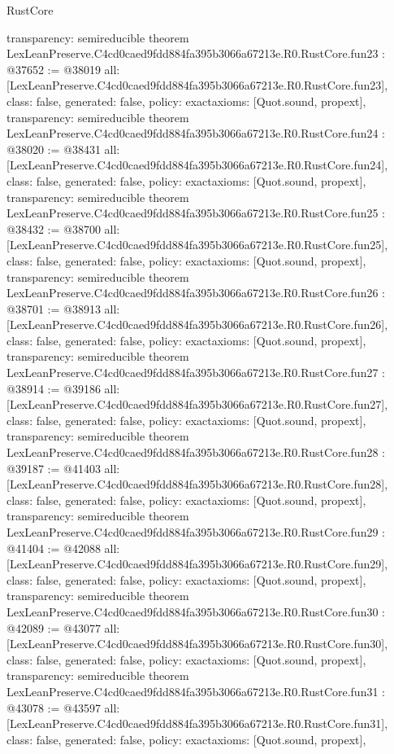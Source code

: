 \begin{lexlean}{RustCore}
\begin{coremodule}
{  transparency: semireducible
}
theorem LexLeanPreserve.C4cd0caed9fdd884fa395b3066a67213e.R0.RustCore.fun23 : @37652 := @38019 {
  all: [LexLeanPreserve.C4cd0caed9fdd884fa395b3066a67213e.R0.RustCore.fun23],
  class: false,
  generated: false,
  policy: exact{axioms: [Quot.sound, propext]},
  transparency: semireducible
}
theorem LexLeanPreserve.C4cd0caed9fdd884fa395b3066a67213e.R0.RustCore.fun24 : @38020 := @38431 {
  all: [LexLeanPreserve.C4cd0caed9fdd884fa395b3066a67213e.R0.RustCore.fun24],
  class: false,
  generated: false,
  policy: exact{axioms: [Quot.sound, propext]},
  transparency: semireducible
}
theorem LexLeanPreserve.C4cd0caed9fdd884fa395b3066a67213e.R0.RustCore.fun25 : @38432 := @38700 {
  all: [LexLeanPreserve.C4cd0caed9fdd884fa395b3066a67213e.R0.RustCore.fun25],
  class: false,
  generated: false,
  policy: exact{axioms: [Quot.sound, propext]},
  transparency: semireducible
}
theorem LexLeanPreserve.C4cd0caed9fdd884fa395b3066a67213e.R0.RustCore.fun26 : @38701 := @38913 {
  all: [LexLeanPreserve.C4cd0caed9fdd884fa395b3066a67213e.R0.RustCore.fun26],
  class: false,
  generated: false,
  policy: exact{axioms: [Quot.sound, propext]},
  transparency: semireducible
}
theorem LexLeanPreserve.C4cd0caed9fdd884fa395b3066a67213e.R0.RustCore.fun27 : @38914 := @39186 {
  all: [LexLeanPreserve.C4cd0caed9fdd884fa395b3066a67213e.R0.RustCore.fun27],
  class: false,
  generated: false,
  policy: exact{axioms: [Quot.sound, propext]},
  transparency: semireducible
}
theorem LexLeanPreserve.C4cd0caed9fdd884fa395b3066a67213e.R0.RustCore.fun28 : @39187 := @41403 {
  all: [LexLeanPreserve.C4cd0caed9fdd884fa395b3066a67213e.R0.RustCore.fun28],
  class: false,
  generated: false,
  policy: exact{axioms: [Quot.sound, propext]},
  transparency: semireducible
}
theorem LexLeanPreserve.C4cd0caed9fdd884fa395b3066a67213e.R0.RustCore.fun29 : @41404 := @42088 {
  all: [LexLeanPreserve.C4cd0caed9fdd884fa395b3066a67213e.R0.RustCore.fun29],
  class: false,
  generated: false,
  policy: exact{axioms: [Quot.sound, propext]},
  transparency: semireducible
}
theorem LexLeanPreserve.C4cd0caed9fdd884fa395b3066a67213e.R0.RustCore.fun30 : @42089 := @43077 {
  all: [LexLeanPreserve.C4cd0caed9fdd884fa395b3066a67213e.R0.RustCore.fun30],
  class: false,
  generated: false,
  policy: exact{axioms: [Quot.sound, propext]},
  transparency: semireducible
}
theorem LexLeanPreserve.C4cd0caed9fdd884fa395b3066a67213e.R0.RustCore.fun31 : @43078 := @43597 {
  all: [LexLeanPreserve.C4cd0caed9fdd884fa395b3066a67213e.R0.RustCore.fun31],
  class: false,
  generated: false,
  policy: exact{axioms: [Quot.sound, propext]},
}
\end{coremodule}
\end{lexlean}
